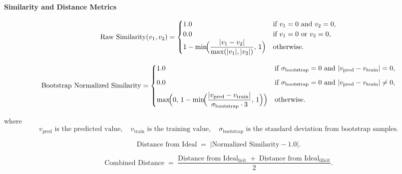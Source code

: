 \documentclass[11pt]{article}
\begin{document}
\begin{center}
    {\Large \textbf{Similarity and Distance Metrics}}\\[1em]
\end{center}

\[
\text{Raw Similarity}(v_1, v_2) = 
\begin{cases}
    1.0 & \text{if } v_1 = 0 \text{ and } v_2 = 0,\\
    0.0 & \text{if } v_1 = 0 \text{ or } v_2 = 0,\\
    1 - \min\!\Bigl(\dfrac{|v_1 - v_2|}{\max(|v_1|, |v_2|)},\,1\Bigr) 
    & \text{otherwise}.
\end{cases}
\]

\[
\text{Bootstrap Normalized Similarity} =
\begin{cases}
    1.0 
        & \text{if } \sigma_{\text{bootstrap}} = 0 \text{ and } |v_{\text{pred}} - v_{\text{train}}| = 0,\\[6pt]
    0.0 
        & \text{if } \sigma_{\text{bootstrap}} = 0 \text{ and } |v_{\text{pred}} - v_{\text{train}}| \neq 0,\\[6pt]
    \max\!\Bigl(
        0,\,
        1 - \min\!\Bigl(\dfrac{|v_{\text{pred}} - v_{\text{train}}|}{\sigma_{\text{bootstrap}} \cdot 3},\,1\Bigr)
    \Bigr)
        & \text{otherwise}.
\end{cases}
\]

\noindent
where 
\[
v_{\text{pred}} \text{ is the predicted value},\quad
v_{\text{train}} \text{ is the training value},\quad
\sigma_{\text{bootstrap}} \text{ is the standard deviation from bootstrap samples}.
\]

\[
\text{Distance from Ideal} \;=\; \bigl|\text{Normalized Similarity} - 1.0\bigr|.
\]

\[
\text{Combined Distance} \;=\;
\frac{\text{Distance from Ideal}_{\text{licit}} \;+\; \text{Distance from Ideal}_{\text{illicit}}}{2}.
\]
\end{document}
